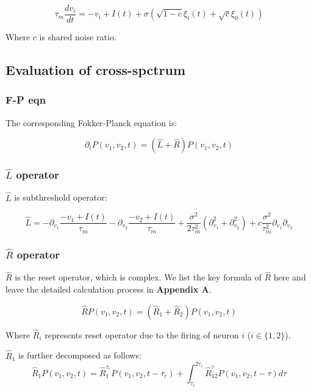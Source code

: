 \documentclass{article}
\begin{document}
	\begin{equation}
	\tau_m \frac{dv_i}{dt}=-v_i+I(t)+\sigma (\sqrt{1-c}\xi_i(t)+\sqrt{c}\xi_0(t))
	\end{equation}
	
	Where $c$ is shared noise ratio.
	
	\subsection{Evaluation of cross-spctrum}
	
	\subsubsection{F-P eqn}
	The corresponding Fokker-Planck equation is:
	
	\begin{equation}
	\partial_tP(v_1,v_2,t)=(\hat{L}+\hat{R})P(v_1,v_2,t)
	\label{eq:F-P eqn}
    \end{equation}

    \subsubsection{$\hat{L}$ operator}
    
	$\hat{L}$ is subthreshold operator:
	
	\begin{equation}
	\hat{L}=-\partial_{v_1}\frac{-v_1+I(t)}{\tau_m}-\partial_{v_2}\frac{-v_2+I(t)}{\tau_m}+\frac{\sigma^2}{2\tau_m^2}(\partial_{v_1}^2+\partial_{v_2}^2)+c\frac{\sigma^2}{\tau_m^2}\partial_{v_1}\partial_{v_2}
	\label{eq3: L operator}
	\end{equation}
	
	\subsubsection{$\hat{R}$ operator}
	$\hat{R}$ is the reset operator, which is complex. We list the key formula of $\hat{R}$ here and leave the detailed calculation process in \textbf{Appendix A}.
	
	\begin{equation}
	\hat{R}P(v_1,v_2,t)=(\hat{R}_1+\hat{R}_2)P(v_1,v_2,t)
	\label{eq: expression of R}
	\end{equation}
	
	Where $\hat{R}_i$ represents reset operator due to the firing of neuron $i$ ($i \in \{1,2\}$).
	
	$\hat{R}_1$ is further decomposed as follows:
	\begin{equation}
		\hat{R}_1P(v_1,v_2,t)=\hat{R}_1^{\tau_r}P(v_1,v_2,t-\tau_r)+\int_{\tau_r}^{2\tau_r}\hat{R}_{12}^{\tau}P(v_1,v_2,t-\tau)d\tau
		\label{eq:decomposition of R}
	\end{equation}
	
\end{document}

